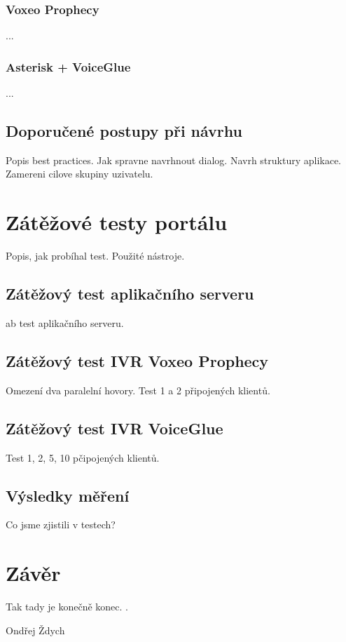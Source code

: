 \documentclass[ing,male,java,dept460]{diploma}						%
\begin{document}
\subsubsection{Voxeo Prophecy}
...

\subsubsection{Asterisk + VoiceGlue}
...

\subsection{Doporučené postupy při návrhu}
Popis best practices. Jak spravne navrhnout dialog. Navrh struktury aplikace. Zamereni cilove skupiny uzivatelu.

\section{Zátěžové testy portálu}
\label{sec:Benchmark}
Popis, jak probíhal test. Použité nástroje.

\subsection{Zátěžový test aplikačního serveru}
ab test aplikačního serveru.

\subsection{Zátěžový test IVR Voxeo Prophecy}
Omezení dva paralelní hovory. Test 1 a 2 připojených klientů.

\subsection{Zátěžový test IVR VoiceGlue}
Test 1, 2, 5, 10 pčipojených klientů.

\subsection{Výsledky měření}
Co jsme zjistili v testech?

\section{Závěr}
\label{sec:Conclusion}
Tak tady je konečně konec.
\cite{goossens94,lamport94}.

\bigskip
\begin{flushright}
Ondřej Ždych
\end{flushright}
\end{document}

